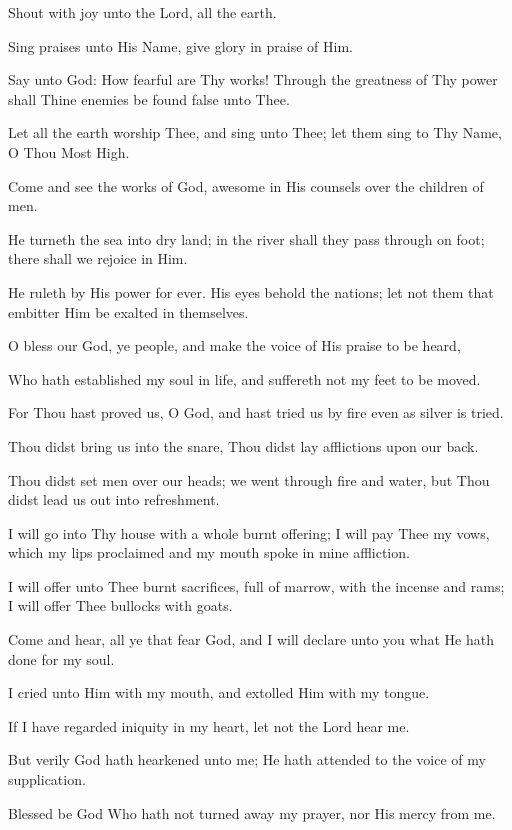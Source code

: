 Shout with joy unto the Lord, all the earth.

Sing praises unto His Name, give glory in praise of Him.

Say unto God: How fearful are Thy works! Through the greatness of Thy power shall Thine enemies be found false unto Thee.

Let all the earth worship Thee, and sing unto Thee; let them sing to Thy Name, O Thou Most High.

Come and see the works of God, awesome in His counsels over the children of men.

He turneth the sea into dry land; in the river shall they pass through on foot; there shall we rejoice in Him.

He ruleth by His power for ever. His eyes behold the nations; let not them that embitter Him be exalted in themselves.

O bless our God, ye people, and make the voice of His praise to be heard,

Who hath established my soul in life, and suffereth not my feet to be moved.

For Thou hast proved us, O God, and hast tried us by fire even as silver is tried.

Thou didst bring us into the snare, Thou didst lay afflictions upon our back.

Thou didst set men over our heads; we went through fire and water, but Thou didst lead us out into refreshment.

I will go into Thy house with a whole burnt offering; I will pay Thee my vows, which my lips proclaimed and my mouth spoke in mine affliction.

I will offer unto Thee burnt sacrifices, full of marrow, with the incense and rams; I will offer Thee bullocks with goats.

Come and hear, all ye that fear God, and I will declare unto you what He hath done for my soul.

I cried unto Him with my mouth, and extolled Him with my tongue.

If I have regarded iniquity in my heart, let not the Lord hear me.

But verily God hath hearkened unto me; He hath attended to the voice of my supplication.

Blessed be God Who hath not turned away my prayer, nor His mercy from me.
